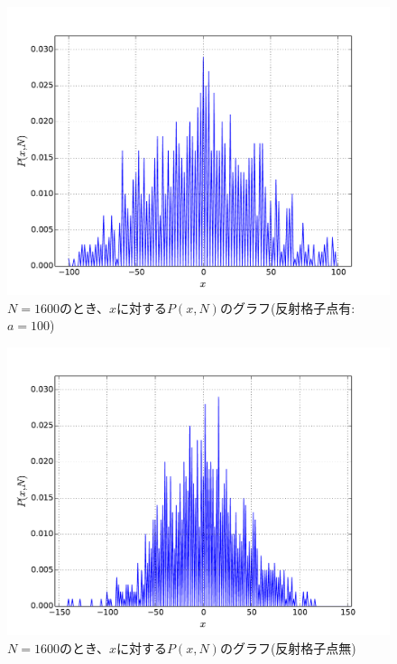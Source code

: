 \documentclass{jsarticle}
\begin{document}
\begin{enumerate}
\begin{enumerate}
                    \begin{figure}[H]
                        \begin{center}
                        \includegraphics[width=12.5cm]{figure_5.pdf}
                        \caption{$N=1600$のとき、$x$に対する$P(x,N)$のグラフ(反射格子点有:$a=100$)}
                        \label{fig:5}
                    \end{center}
                    \end{figure}


                    \begin{figure}[H]
                        \begin{center}
                        \includegraphics[width=12.5cm]{figure_6.pdf}
                        \caption{$N=1600$のとき、$x$に対する$P(x,N)$のグラフ(反射格子点無)}
                        \label{fig:6}
                    \end{center}
                    \end{figure}



\end{enumerate}
\end{enumerate}
\end{document}
